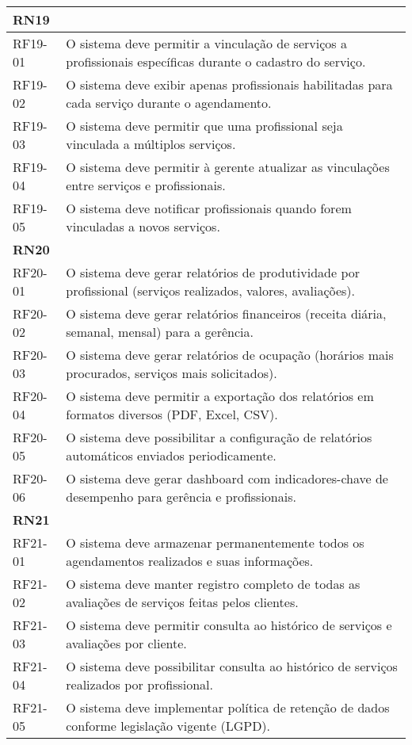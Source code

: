 \begin{longtable}{|p{}|p{}|}
	\multicolumn{2}{|l|}{\textbf{RN19}} \\ \hline
	RF19-01 & O sistema deve permitir a vinculação de serviços a profissionais específicas durante o cadastro do serviço. \\ \hline
	RF19-02 & O sistema deve exibir apenas profissionais habilitadas para cada serviço durante o agendamento. \\ \hline
	RF19-03 & O sistema deve permitir que uma profissional seja vinculada a múltiplos serviços. \\ \hline
	RF19-04 & O sistema deve permitir à gerente atualizar as vinculações entre serviços e profissionais. \\ \hline
	RF19-05 & O sistema deve notificar profissionais quando forem vinculadas a novos serviços. \\ \hline
	
	\multicolumn{2}{|l|}{\textbf{RN20}} \\ \hline
	RF20-01 & O sistema deve gerar relatórios de produtividade por profissional (serviços realizados, valores, avaliações). \\ \hline
	RF20-02 & O sistema deve gerar relatórios financeiros (receita diária, semanal, mensal) para a gerência. \\ \hline
	RF20-03 & O sistema deve gerar relatórios de ocupação (horários mais procurados, serviços mais solicitados). \\ \hline
	RF20-04 & O sistema deve permitir a exportação dos relatórios em formatos diversos (PDF, Excel, CSV). \\ \hline
	RF20-05 & O sistema deve possibilitar a configuração de relatórios automáticos enviados periodicamente. \\ \hline
	RF20-06 & O sistema deve gerar dashboard com indicadores-chave de desempenho para gerência e profissionais. \\ \hline
	
	\multicolumn{2}{|l|}{\textbf{RN21}} \\ \hline
	RF21-01 & O sistema deve armazenar permanentemente todos os agendamentos realizados e suas informações. \\ \hline
	RF21-02 & O sistema deve manter registro completo de todas as avaliações de serviços feitas pelos clientes. \\ \hline
	RF21-03 & O sistema deve permitir consulta ao histórico de serviços e avaliações por cliente. \\ \hline
	RF21-04 & O sistema deve possibilitar consulta ao histórico de serviços realizados por profissional. \\ \hline
	RF21-05 & O sistema deve implementar política de retenção de dados conforme legislação vigente (LGPD). \\ \hline
	

\end{longtable}
